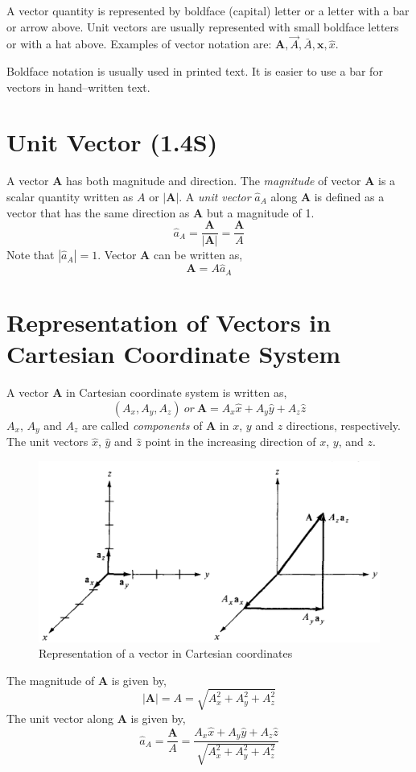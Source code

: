 \documentclass[12pt,a4paper]{article}
\begin{document}
A vector quantity is represented by boldface (capital) letter or a letter with a bar or arrow above. Unit  vectors are usually represented with small boldface letters or with a hat above. Examples of vector notation are: $\textbf{{A}}, \vec{A}, \bar{A}, \textbf{x}, \hat{x}$.

Boldface notation is usually used in printed text. It is easier to use a bar for vectors in hand--written text.
\section{Unit Vector (1.4S)}
A vector \textbf{A} has both magnitude and direction. The \textit{magnitude} of vector \textbf{A} is a scalar quantity written as $A$ or $|\textbf{A}|$. A \textit{unit vector} $\hat{a}_A$ along \textbf{A} is defined as a vector that has the same direction as \textbf{A} but a magnitude of 1.
\begin{equation}
\hat{a}_A=\dfrac{\textbf{A}}{|\textbf{A}|}=\dfrac{\textbf{A}}{A}
\end{equation}
Note that $|\hat{a}_A|=1$. Vector \textbf{A} can be written as,
\begin{equation}
\textbf{A}=A\hat{a}_A
\end{equation}
\section{Representation of Vectors in Cartesian Coordinate System}
A vector \textbf{A} in Cartesian coordinate system is written as,
\begin{equation}
(A_x,A_y,A_z)~or~\textbf{A}=A_x\hat{x}+A_y\hat{y}+A_z\hat{z}
\end{equation}
$A_x$, $A_y$ and $A_z$ are called \textit{components} of \textbf{A} in $x$, $y$ and $z$ directions, respectively. The unit vectors $\hat x$, $\hat y$ and $\hat z$ point in the increasing direction of $x$, $y$, and $z$.
\begin{figure}[H]
\includegraphics[scale=0.5]{Figure1-1S.png}
\caption{Representation of a vector in Cartesian coordinates \cite[fig. 1.1]{Sadiku}}
\label{components-of-A}
\end{figure}
The magnitude of \textbf{A} is given by,
\begin{equation}
|\textbf{A}|=A=\sqrt{A_x^2+A_y^2+A_z^2}
\end{equation}
The unit vector along \textbf{A} is given by,
\begin{equation}
\hat{a}_A=\dfrac{\textbf{A}}{A}=\dfrac{A_x\hat{x}+A_y\hat{y}+A_z\hat{z}}{\sqrt{A_x^2+A_y^2+A_z^2}}
\end{equation}
\end{document}
